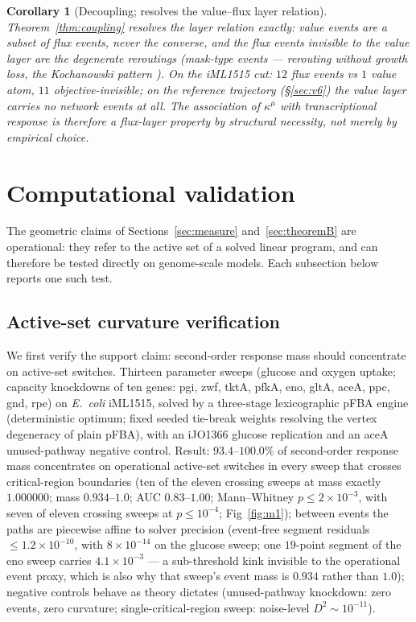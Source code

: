 \documentclass[11pt,a4paper]{article}
\theoremstyle{plain}
\newtheorem{corollary}[theorem]{Corollary}
\theoremstyle{definition}
\theoremstyle{remark}
\newcommand{\kmu}{\kappa^{\mu}}
\begin{document}
\begin{corollary}[Decoupling; resolves the value--flux layer
relation]\label{cor:valueflux}
Theorem~\ref{thm:coupling} resolves the layer relation exactly: value
events are a subset of flux events, never the converse, and the flux
events invisible to the value layer are the degenerate reroutings
(mask-type events --- rerouting without growth loss, the Kochanowski pattern \citep{kochanowski2013}). On the iML1515 cut: $12$ flux events vs $1$ value atom, $11$ objective-invisible; on the reference trajectory (\S\ref{sec:v6}) the
value layer carries no network events at all. The association of
$\kmu$ with transcriptional response is therefore a flux-layer
property by structural necessity, not merely by empirical choice.
\end{corollary}

\section{Computational validation}\label{sec:computational}

The geometric claims of Sections~\ref{sec:measure}
and~\ref{sec:theoremB} are operational: they refer to the active set
of a solved linear program, and can therefore be tested directly on
genome-scale models. Each subsection below reports one such test.


\subsection{Active-set curvature verification}
\label{sec:m1}
We first verify the support claim: second-order response mass should
concentrate on active-set switches. Thirteen parameter sweeps (glucose and oxygen uptake; capacity
knockdowns of ten genes: pgi, zwf, tktA, pfkA, eno, gltA, aceA, ppc,
gnd, rpe) on \emph{E.~coli} iML1515, solved by a
three-stage lexicographic pFBA engine (deterministic optimum; fixed seeded
tie-break weights resolving the vertex degeneracy of plain pFBA), with
an iJO1366 glucose replication and an aceA unused-pathway negative
control.
Result: $93.4$--$100.0\%$ of second-order response mass concentrates on
operational active-set switches in every sweep that crosses
critical-region boundaries (ten of the eleven crossing sweeps at mass
exactly $1.000000$; mass $0.934$--$1.0$; AUC $0.83$--$1.00$;
Mann--Whitney $p \le 2 \times 10^{-3}$, with seven of eleven crossing
sweeps at $p \le 10^{-4}$; Fig~\ref{fig:m1}); between events the paths are piecewise
affine to solver precision (event-free segment residuals $\le 1.2
\times 10^{-10}$, with $8 \times 10^{-14}$ on the glucose sweep; one
$19$-point segment of the eno sweep carries $4.1 \times 10^{-3}$ ---
a sub-threshold kink invisible to the operational event proxy, which
is also why that sweep's event mass is $0.934$ rather than $1.0$);
negative controls behave as theory dictates (unused-pathway knockdown:
zero events, zero curvature; single-critical-region sweep: noise-level
$D^2 \sim 10^{-11}$).
\end{document}
